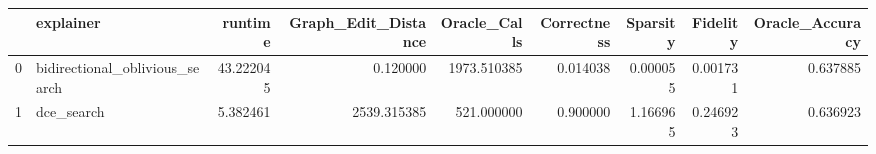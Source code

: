 \begin{tabular}{llrrrrrrr}
\toprule
{} &                       explainer &    runtime &  Graph\_Edit\_Distance &  Oracle\_Calls &  Correctness &  Sparsity &  Fidelity &  Oracle\_Accuracy \\
\midrule
0 &  bidirectional\_oblivious\_search &  43.222045 &             0.120000 &   1973.510385 &     0.014038 &  0.000055 &  0.001731 &         0.637885 \\
1 &                      dce\_search &   5.382461 &          2539.315385 &    521.000000 &     0.900000 &  1.166965 &  0.246923 &         0.636923 \\
\bottomrule
\end{tabular}
